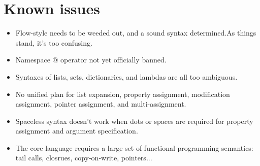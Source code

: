 \chapter{Known issues}

\begin{itemize}
\item Flow-style needs to be weeded out, and a sound syntax determined.As things stand, it's too confusing.
\item Namespace @ operator not yet officially banned.
\item Syntaxes of lists, sets, dictionaries, and lambdas are all too ambiguous.
\item No unified plan for list expansion, property assignment, modification assignment, pointer assignment, and multi-assignment.
\item Spaceless syntax doesn't work when dots or spaces are required for property assignment and argument specification.
\end{itemize}

\begin{itemize}
\item The core language requires a large set of functional-programming semantics: tail calls, closrues, copy-on-write, pointers...
\end{itemize}
